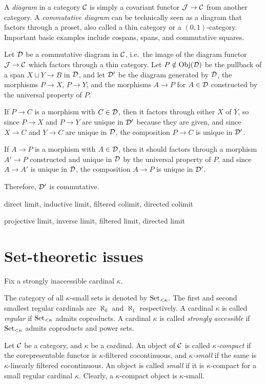 \documentclass{../../large}
\begin{document}
\begin{prb}
A \emph{diagram} in a category $\mathcal{C}$ is simply a covariant functor $\mathcal{J}\to\mathcal{C}$ from another category.
A \emph{commutative diagram} can be technically seen as a diagram that factors through a proset, also called a thin category or a $(0,1)$-category.
Important basic examples include cospans, spans, and commutative squares.


Let $\mathcal{D}$ be a commutative diagram in $\mathcal{C}$, i.e.~the image of the diagram functor $\mathcal{J}\to\mathcal{C}$ which factors through a thin category.
Let $P\notin\operatorname{Obj}(\mathcal{D})$ be the pullback of a span $X\sqcup Y\to B$ in $\mathcal{D}$, and let $\mathcal{D}'$ be the diagram generated by $\mathcal{D}$, the morphisms $P\to X$, $P\to Y$, and the morphisms $A\to P$ for $A\in\mathcal{D}$ constructed by the universal property of $P$.

If $P\to C$ is a morphism with $C\in\mathcal{D}$, then it factors through either $X$ of $Y$, so since $P\to X$ and $P\to Y$ are unique in $\mathcal{D}'$ because they are given, and since $X\to C$ and $Y\to C$ are unique in $\mathcal{D}$, the composition $P\to C$ is unique in $\mathcal{D}'$.

If $A\to P$ is a morphism with $A\in\mathcal{D}$, then it should factors through a morphism $A'\to P$ constructed and unique in $\mathcal{D}$ by the universal property of $P$, and since $A\to A'$ is unique in $\mathcal{D}$, the composition $A\to P$ is unique in $\mathcal{D}'$.

Therefore, $\mathcal{D}'$ is commutative.




\end{prb}


direct limit, inductive limit, filtered colimit, directed colimit

projective limit, inverse limit, filtered limit, directed limit

\section{Set-theoretic issues}


Fix a strongly inaccessible cardinal $\kappa$.

The category of all $\kappa$-small sets is denoted by $\operatorname{Set}_{<\kappa}$.
The first and second smallest regular cardinals are $\aleph_0$ and $\aleph_1$ respectively.
A cardinal $\kappa$ is called \emph{regular} if $\operatorname{Set}_{<\kappa}$ admits coproducts.
A cardinal $\kappa$ is called \emph{strongly accessible} if $\operatorname{Set}_{<\kappa}$ admits coproducts and power sets.


Let $\mathcal{C}$ be a category, and $\kappa$ be a cardinal.
An object of $\mathcal{C}$ is called \emph{$\kappa$-compact} if the corepresentable functor is $\kappa$-filtered cocontinuous, and \emph{$\kappa$-small} if the same is $\kappa$-linearly filtered cocontinuous.
An object is called \emph{small} if it is $\kappa$-compact for a small regular cardinal $\kappa$.
Clearly, a $\kappa$-compact object is $\kappa$-small.
\end{document}

